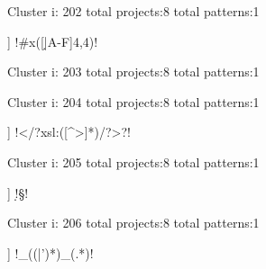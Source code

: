Cluster i: 202
total projects:8
total patterns:1
\begin{multicols}{1}
\begin{description}[noitemsep,topsep=0pt]
\item [[8] ] \cverb!#x([\d|A-F]{4,4})!
\end{description}
\end{multicols}







Cluster i: 203
total projects:8
total patterns:1
\begin{multicols}{1}
\end{multicols}







Cluster i: 204
total projects:8
total patterns:1
\begin{multicols}{1}
\begin{description}[noitemsep,topsep=0pt]
\item [[8] ] \cverb!</?xsl:([^>]*)/?>?!
\end{description}
\end{multicols}







Cluster i: 205
total projects:8
total patterns:1
\begin{multicols}{1}
\begin{description}[noitemsep,topsep=0pt]
\item [[8] ] \cverb!\d\D\w\W\s\S!
\end{description}
\end{multicols}







Cluster i: 206
total projects:8
total patterns:1
\begin{multicols}{1}
\begin{description}[noitemsep,topsep=0pt]
\item [[8] ] \cverb!_(\w(\w|')*)_(.*)!
\end{description}
\end{multicols}







